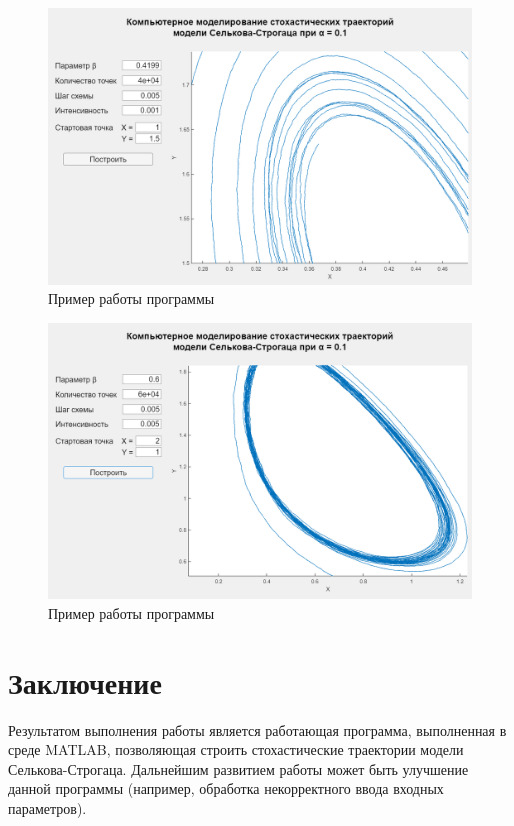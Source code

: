 \documentclass[a4paper, 14pt]{article}
\begin{document}
			\begin{figure}[!ht]
				\begin{center}
					\includegraphics[scale=0.35]{img/ex3.png}\caption{Пример работы программы}
				\end{center}
			\end{figure}
		
			\newpage
			
			\begin{figure}[!ht]
				\begin{center}
					\includegraphics[scale=0.35]{img/ex4.png}\caption{Пример работы программы}
				\end{center}
			\end{figure}
		
		\newpage
	
	\section{Заключение}
		
		Результатом выполнения работы является работающая программа, выполненная в среде MATLAB, позволяющая строить стохастические траектории модели Селькова-Строгаца. Дальнейшим развитием работы может быть улучшение данной программы (например, обработка некорректного ввода входных параметров).
		
\end{document}
